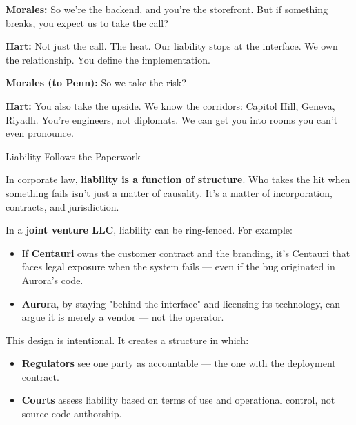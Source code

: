 \medskip


\textbf{Morales:}
So we’re the backend, and you’re the storefront.
But if something breaks, you expect us to take the call?

\textbf{Hart:}
Not just the call. The heat.
Our liability stops at the interface.
We own the relationship. You define the implementation.

\textbf{Morales (to Penn):}
So we take the risk?

\textbf{Hart:}
You also take the upside.
We know the corridors: Capitol Hill, Geneva, Riyadh.
You’re engineers, not diplomats.
We can get you into rooms you can’t even pronounce.


\begin{TechnicalSidebar}{Liability Follows the Paperwork}

  In corporate law, \textbf{liability is a function of structure}.  
  Who takes the hit when something fails isn’t just a matter of causality. It’s a matter of incorporation, contracts, 
  and jurisdiction.
  
  \medskip
  
  In a \textbf{joint venture LLC}, liability can be ring-fenced. For example:

  \medskip

  \begin{itemize}
    \item If \textbf{Centauri} owns the customer contract and the branding, it's Centauri that faces legal exposure when the 
    system fails — even if the bug originated in Aurora's code.
    \item \textbf{Aurora}, by staying "behind the interface" and licensing its technology, can argue it is merely a vendor — 
    not the operator.
  \end{itemize}
  
  \medskip
  
  This design is intentional.  
  It creates a structure in which:

  \medskip

  \begin{itemize}
    \item \textbf{Regulators} see one party as accountable — the one with the deployment contract.
    \item \textbf{Courts} assess liability based on terms of use and operational control, not source code authorship.
  \end{itemize}
  
  \medskip
  

\end{TechnicalSidebar}
